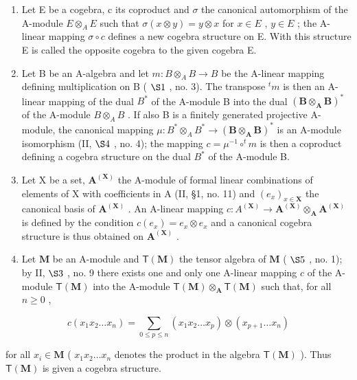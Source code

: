 \begin{enumerate}
\def\labelenumi{(\arabic{enumi})}
\setcounter{enumi}{1}
\item
  Let E be a cogebra, c its coproduct and \(\sigma\) the canonical automorphism of the A-module \(E \otimes_{A} E\) such that \(\sigma(x \otimes y) = y \otimes x\) for \(x \in E\) , \(y \in E\) ; the A-linear mapping \(\sigma \circ c\) defines a new cogebra structure on E. With this structure E is called the opposite cogebra to the given cogebra E.
\item
  Let B be an A-algebra and let \(m:B \otimes_{A} B \to B\) be the A-linear mapping defining multiplication on B ( \(\S 1\) , no. 3). The transpose \(^{t}m\) is then an A-linear mapping of the dual \(B^{*}\) of the A-module B into the dual \((\mathbf{B} \otimes_{\mathbf{A}} \mathbf{B})^{*}\) of the A-module \(B \otimes_{A} B\) . If also B is a finitely generated projective A-module, the canonical mapping \(\mu:B^{*} \otimes_{A} B^{*} \to (\mathbf{B} \otimes_{\mathbf{A}} \mathbf{B})^{*}\) is an A-module isomorphism (II, \(\S 4\) , no. 4); the mapping \(c = \mu^{-1} \circ ^{t}m\) is then a coproduct defining a cogebra structure on the dual \(B^{*}\) of the A-module B.
\item
  Let X be a set, \(\mathbf{A}^{(\mathbf{X})}\) the A-module of formal linear combinations of elements of X with coefficients in A (II, §1, no. 11) and \((e_{x})_{x\in\mathbf{X}}\) the canonical basis of \(\mathbf{A}^{(\mathbf{X})}\) . An A-linear mapping \(c:A^{(\mathbf{X})}\to\mathbf{A}^{(\mathbf{X})}\otimes_{\mathbf{A}}\mathbf{A}^{(\mathbf{X})}\) is defined by the condition \(c(e_{x})=e_{x}\otimes e_{x}\) and a canonical cogebra structure is thus obtained on \(\mathbf{A}^{(\mathbf{X})}\) .
\item
  Let \(\mathbf{M}\) be an A-module and \(\mathsf{T}(\mathbf{M})\) the tensor algebra of \(\mathbf{M}\) ( \(\S 5\) , no. 1); by II, \(\S 3\) , no. 9 there exists one and only one A-linear mapping \(c\) of the A-module \(\mathsf{T}(\mathbf{M})\) into the A-module \(\mathsf{T}(\mathbf{M}) \otimes_{\mathbf{A}} \mathsf{T}(\mathbf{M})\) such that, for all \(n \geqslant 0\) ,
\end{enumerate}

\[
c (x _ {1} x _ {2} \dots x _ {n}) = \sum_ {0 \leqslant p \leqslant n} (x _ {1} x _ {2} \dots x _ {p}) \otimes (x _ {p + 1} \dots x _ {n})\tag{3}
\]

for all \(x_{i} \in \mathbf{M}\) ( \(x_{1}x_{2}\ldots x_{n}\) denotes the product in the algebra \(\mathsf{T}(\mathbf{M})\) ). Thus \(\mathsf{T}(\mathbf{M})\) is given a cogebra structure.

